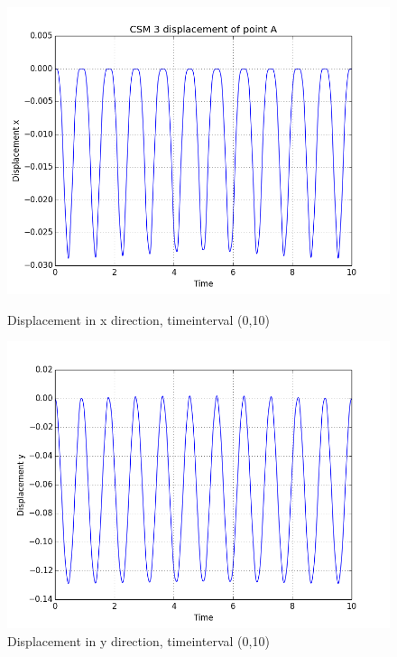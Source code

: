 \begin{figure}[H]  
\centering
  \begin{minipage}[b]{0.60\linewidth}
    \centering
    \includegraphics[width=0.9\linewidth,trim={2mm 2mm 5mm 5mm},clip]{./Verification_Validation//Hron_Turek/dis_x.png} 
    \caption{Displacement in x direction, timeinterval (0,10)} 
    \vspace{4ex}
  \end{minipage}%
  \begin{minipage}[b]{0.60\linewidth}
    \centering
    \includegraphics[width=0.9\linewidth,trim={2mm 2mm 5mm 5mm},clip]{./Verification_Validation//Hron_Turek/dis_y.png} 
    \caption{Displacement in y direction, timeinterval (0,10)} 
    \vspace{4ex}
  \end{minipage} 
  \begin{minipage}[b]{0.60\linewidth}

\end{minipage}
\end{figure}
